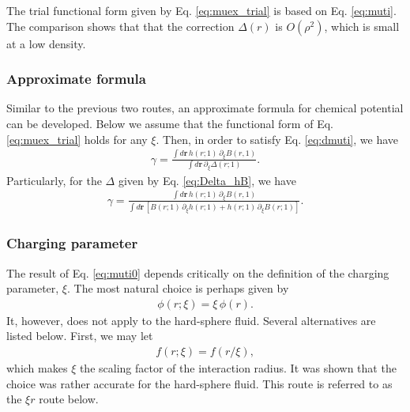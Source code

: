 \documentclass[aip,jcp,reprint,superscriptaddress]{revtex4-1}
\newcommand{\vct}[1]{\mathbf{#1}}
\providecommand{\vr}{} %
\renewcommand{\vr}{\vct{r}}
\begin{document}
The trial functional form
given by Eq. \eqref{eq:muex_trial}
is based on Eq. \eqref{eq:muti}.
%
The comparison shows that
that the correction $\Delta(r)$ is $O(\rho^2)$,
which is small at a low density.




\subsubsection{Approximate formula}





Similar to the previous two routes,
an approximate formula for chemical potential
can be developed.
%
Below we assume that
the functional form of Eq. \eqref{eq:muex_trial}
holds for any $\xi$.
%
Then,
in order to satisfy Eq. \eqref{eq:dmuti},
we have
%
\begin{align}
\gamma
=
\frac
{
  \int d\vr \,
  h(r; 1) \, \partial_\xi B(r, 1)
}
{
  \int d\vr \,
  \partial_\xi \Delta(r; 1)
}.
\label{eq:gamma_xi_Delta}
\end{align}
%
Particularly,
for the $\Delta$ given by Eq. \eqref{eq:Delta_hB},
we have
%
\begin{align}
\gamma
=
\frac
{
  \int d\vr \, h(r; 1) \, \partial_\xi B(r, 1)
}
{
  \int d\vr \,
  \left[
  B(r; 1) \, \partial_\xi h(r; 1)
  +
  h(r; 1) \, \partial_\xi B(r; 1)
  \right]
}.
\label{eq:gamma_xi}
\end{align}
%





\subsubsection{Charging parameter}




The result of Eq. \eqref{eq:muti0}
depends critically on
the definition
of the charging parameter, $\xi$.
%
%
%
%
The most natural choice is perhaps
given by
%
\begin{align}
\phi(r; \xi)
=
\xi \, \phi(r).
\label{eq:xi_phi}
\end{align}
%
It, however, does not apply
to the hard-sphere fluid.
%
Several alternatives are listed below.
%
First,
we may let
%
\begin{align}
f(r; \xi)
=
f(r/\xi),
\label{eq:xi_r}
\end{align}
%
which makes $\xi$ the scaling factor
of the interaction radius.
%
It was shown that
the choice was rather accurate
for the hard-sphere fluid\cite{
santos2012, santos2013}.
%
This route is referred to as
the $\xi r$ route below.
\end{document}
